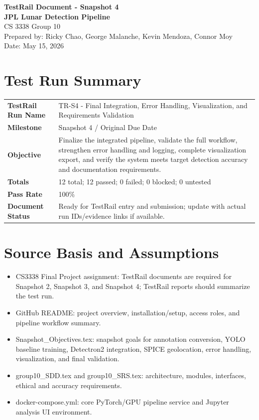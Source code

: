 \documentclass[11pt,landscape]{article}
\begin{document}
\begin{center}
{\LARGE\textbf{TestRail Document - Snapshot 4}}\\[0.3cm]
{\large\textbf{JPL Lunar Detection Pipeline}}\\
CS 3338 Group 10\\
Prepared by: Ricky Chao, George Malanche, Kevin Mendoza, Connor Moy\\
Date: May 15, 2026
\end{center}
\section*{Test Run Summary}
\begin{tabular}{p{2.2in}p{7.6in}}\toprule
\textbf{TestRail Run Name} & TR-S4 - Final Integration, Error Handling, Visualization, and Requirements Validation \\
\textbf{Milestone} & Snapshot 4 / Original Due Date \\
\textbf{Objective} & Finalize the integrated pipeline, validate the full workflow, strengthen error handling and logging, complete visualization export, and verify the system meets target detection accuracy and documentation requirements. \\
\textbf{Totals} & 12 total; 12 passed; 0 failed; 0 blocked; 0 untested \\
\textbf{Pass Rate} & 100\% \\
\textbf{Document Status} & Ready for TestRail entry and submission; update with actual run IDs/evidence links if available. \\
\bottomrule\end{tabular}
\section*{Source Basis and Assumptions}
\begin{itemize}[leftmargin=*]
\item CS3338 Final Project assignment: TestRail documents are required for Snapshot 2, Snapshot 3, and Snapshot 4; TestRail reports should summarize the test run.
\item GitHub README: project overview, installation/setup, access roles, and pipeline workflow summary.
\item Snapshot\_Objectives.tex: snapshot goals for annotation conversion, YOLO baseline training, Detectron2 integration, SPICE geolocation, error handling, visualization, and final validation.
\item group10\_SDD.tex and group10\_SRS.tex: architecture, modules, interfaces, ethical and accuracy requirements.
\item docker-compose.yml: core PyTorch/GPU pipeline service and Jupyter analysis UI environment.
\end{itemize}
\end{document}
